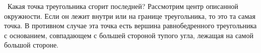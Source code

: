 \indent\indent\ Какая точка треугольника сгорит последней?
Рассмотрим центр описанной окружности. Если он лежит внутри
или на границе треугольника, то это та самая точка.
В противном случае эта точка есть вершина равнобедренного
треугольника с основанием, совпадающем с большей стороной
тупого угла, лежащая на самой большой стороне.
